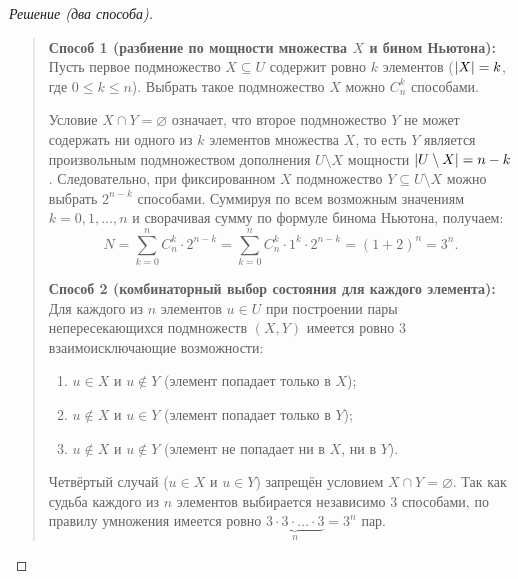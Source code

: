 \begin{proof}[Решение (два способа)]~\\
    \begin{quote}
        \textbf{Способ 1 (разбиение по мощности множества $X$ и бином 
        Ньютона):}\\
        Пусть первое подмножество $X \subseteq U$ содержит ровно $k$ 
        элементов ($\left| X \right| = k$, где $0 \le k \le n$). Выбрать такое 
        подмножество $X$ можно $C_n^k$ способами.

        Условие $X \cap Y = \varnothing$ означает, что второе подмножество 
        $Y$ не может содержать ни одного из $k$ элементов множества $X$, то 
        есть $Y$ является произвольным подмножеством дополнения 
        $U \setminus X$ мощности $\left| U \setminus X \right| = n - k$. 
        Следовательно, при фиксированном $X$ подмножество $Y \subseteq U \setminus X$ 
        можно выбрать $2^{n-k}$ способами. Суммируя по всем возможным 
        значениям $k = 0, 1, \dots, n$ и сворачивая сумму по формуле 
        бинома Ньютона, получаем:
        \begin{equation} \label{eq:disjoint_subsets_binom}
            N = \sum_{k=0}^{n} C_n^k \cdot 2^{n-k} = 
            \sum_{k=0}^{n} C_n^k \cdot 1^k \cdot 2^{n-k} = (1 + 2)^n = 3^n. 
            \tag{7}
        \end{equation}

        \textbf{Способ 2 (комбинаторный выбор состояния для каждого 
        элемента):}\\
        Для каждого из $n$ элементов $u \in U$ при построении пары 
        непересекающихся подмножеств $(X, Y)$ имеется ровно $3$ 
        взаимоисключающие возможности:
        \begin{enumerate}
            \item $u \in X$ и $u \notin Y$ (элемент попадает только в $X$);
            \item $u \notin X$ и $u \in Y$ (элемент попадает только в $Y$);
            \item $u \notin X$ и $u \notin Y$ (элемент не попадает ни в $X$, 
            ни в $Y$).
        \end{enumerate}
        Четвёртый случай ($u \in X$ и $u \in Y$) запрещён условием 
        $X \cap Y = \varnothing$. Так как судьба каждого из $n$ элементов 
        выбирается независимо $3$ способами, по правилу умножения имеется 
        ровно $\underbrace{3 \cdot 3 \cdot \dots \cdot 3}_{n} = 3^n$ пар.
    \end{quote}
\end{proof}

